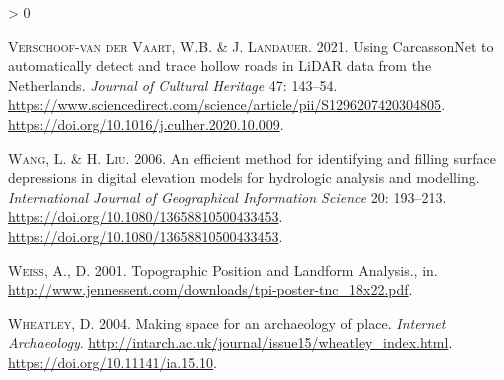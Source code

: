 \documentclass[
  12pt,
]{article}
\newlength{\cslhangindent}
\newenvironment{CSLReferences}[2] %
 {%
  \setlength{\parindent}{0pt}
  \ifodd #1 \everypar{\setlength{\hangindent}{\cslhangindent}}\ignorespaces\fi
  \ifnum #2 > 0
  \setlength{\parskip}{#2\baselineskip}
  \fi
 }%
 {}
\begin{document}
\begin{CSLReferences}{1}{0}
\leavevmode\hypertarget{ref-verschoof-vandervaartUsingCarcassonNetAutomatically2021}{}%
\textsc{Verschoof-van der Vaart}, W.B. \& J. \textsc{Landauer}. 2021. Using {CarcassonNet} to automatically detect and trace hollow roads in {LiDAR} data from the {Netherlands}. \emph{Journal of Cultural Heritage} 47: 143--54. \url{https://www.sciencedirect.com/science/article/pii/S1296207420304805}. \url{https://doi.org/10.1016/j.culher.2020.10.009}.

\leavevmode\hypertarget{ref-wangEfficientMethodIdentifying2006}{}%
\textsc{Wang}, L. \& H. \textsc{Liu}. 2006. An efficient method for identifying and filling surface depressions in digital elevation models for hydrologic analysis and modelling. \emph{International Journal of Geographical Information Science} 20: 193--213. \url{https://doi.org/10.1080/13658810500433453}. \url{https://doi.org/10.1080/13658810500433453}.

\leavevmode\hypertarget{ref-weissTopographicPositionLandform2001}{}%
\textsc{Weiss}, A., D. 2001. Topographic {Position} and {Landform} {Analysis}., in. \url{http://www.jennessent.com/downloads/tpi-poster-tnc_18x22.pdf}.

\leavevmode\hypertarget{ref-wheatleyMakingSpaceArchaeology2004}{}%
\textsc{Wheatley}, D. 2004. Making space for an archaeology of place. \emph{Internet Archaeology}. \url{http://intarch.ac.uk/journal/issue15/wheatley_index.html}. \url{https://doi.org/10.11141/ia.15.10}.

\end{CSLReferences}
\end{document}
